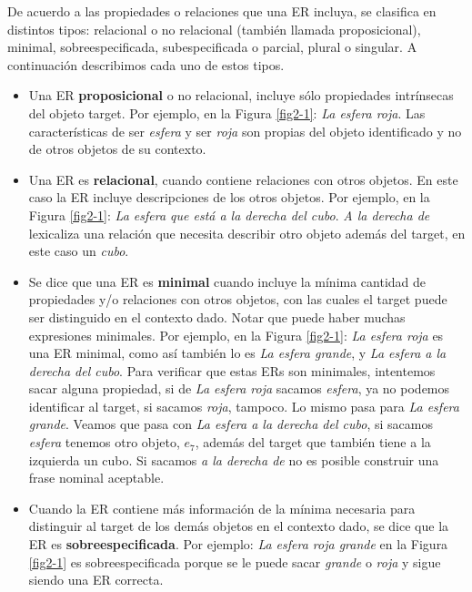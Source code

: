 De acuerdo a las propiedades o relaciones que una ER incluya, se clasifica en distintos tipos: relacional o no relacional (tambi\'en llamada proposicional), minimal, sobreespecificada, subespecificada o parcial, plural o singular. A continuaci\'on describimos cada uno de estos tipos.
\begin{itemize}
\item Una ER {\bf proposicional} o no relacional, incluye s\'olo propiedades intr\'insecas del objeto target. Por ejemplo, en la Figura \ref{fig2-1}: {\it La esfera roja}. Las caracter\'isticas de ser \emph{esfera} y ser \emph{roja} son propias del objeto identificado y no de otros objetos de su contexto.

\item Una ER es {\bf relacional}, cuando contiene relaciones con otros objetos. En este caso la ER incluye descripciones de los otros objetos. Por ejemplo, en la Figura \ref{fig2-1}: {\it La esfera que est\'a a la derecha del cubo}. {\it A la derecha de} lexicaliza una relaci\'on que necesita describir otro objeto adem\'as del target, en este caso un {\it cubo}.

\item \label{sec:minimales} Se dice que una ER es {\bf minimal} cuando incluye la m\'inima cantidad de propiedades y/o relaciones con otros objetos, con las cuales el target puede ser distinguido en el contexto dado. Notar que puede haber muchas expresiones minimales. Por ejemplo, en la Figura \ref{fig2-1}: {\it La esfera roja} es una ER minimal, como as\'i tambi\'en lo es {\it La esfera grande}, y {\it La esfera a la derecha del cubo}. Para verificar que estas ERs son minimales, intentemos sacar alguna propiedad, si de {\it La esfera roja} sacamos {\it esfera}, ya no podemos identificar al target, si sacamos {\it roja}, tampoco. Lo mismo pasa para {\it La esfera grande}. Veamos que pasa con {\it La esfera a la derecha del cubo}, si sacamos {\it esfera} tenemos otro objeto, $e_7$, adem\'as del target que tambi\'en tiene a la izquierda un cubo. Si sacamos {\it a la derecha de} no es posible construir una frase nominal aceptable. 

\item Cuando la ER contiene m\'as informaci\'on de la m\'inima necesaria para distinguir al target de los dem\'as objetos en el contexto dado, se dice que la ER es {\bf sobreespecificada}. Por ejemplo: {\it La esfera roja grande} en la Figura \ref{fig2-1} es sobreespecificada porque se le puede sacar {\it grande} o {\it roja} y sigue siendo una ER correcta. \label{er-sobreespecificadas}


\end{itemize}
